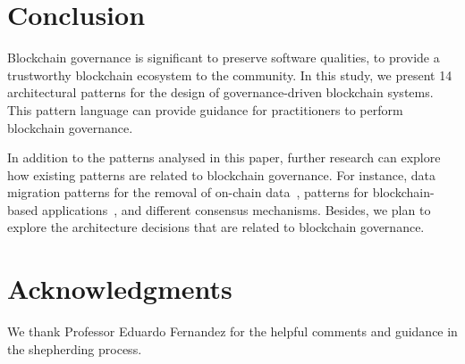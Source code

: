 \documentclass{article}
\begin{document}
\section{Conclusion}
\label{conclusion}

Blockchain governance is significant to preserve software qualities, to provide a trustworthy blockchain ecosystem to the community. In this study, we present 14 architectural patterns for the design of governance-driven blockchain systems. This pattern language can provide guidance for practitioners to perform blockchain governance.


In addition to the patterns analysed in this paper, further research can explore how existing patterns are related to blockchain governance. For instance, data migration patterns for the removal of on-chain data~\cite{data_migration}, patterns for blockchain-based applications~\cite{xu2018pattern}, and different consensus mechanisms\cite{consensus_survey, PoW_pattern}. Besides, we plan to explore the architecture decisions that are related to blockchain governance.


\section*{Acknowledgments}

We thank Professor Eduardo Fernandez for the helpful comments and guidance in the shepherding process.


%
%

\end{document}

